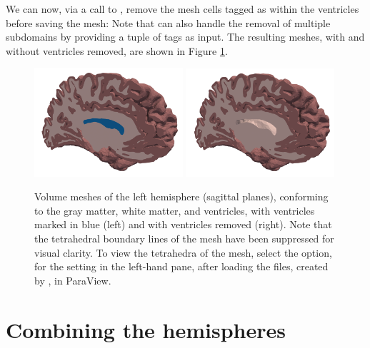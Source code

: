 We can now, via a call to \svmtk{} ,
remove the mesh cells tagged as within the ventricles before saving
the mesh:
Note that  can also handle the removal of
multiple subdomains by providing a tuple of tags as input. The resulting
meshes, with and without ventricles removed, are shown in Figure
\ref{fig:chp4:tags-with-without-ventricles}.
\begin{center}
\begin{figure}
  \includegraphics[width=0.49\textwidth]{./graphics/chp4/ernie-final-comp-b}
  \includegraphics[width=0.49\textwidth]{./graphics/chp4/ernie-final-comp-d}
    \caption{Volume meshes of the left hemisphere (sagittal planes),
      conforming to the gray matter, white matter, and ventricles, with
      ventricles marked in blue (left) and with ventricles removed (right). 
	Note that the tetrahedral boundary lines of the mesh have been 
	suppressed for visual clarity. To view the tetrahedra of the mesh, 
	select the  option, for the  
	setting in the left-hand pane, after loading the  files, 
	created by , in ParaView. 
	}
    \label{fig:chp4:tags-with-without-ventricles}
\end{figure}
\end{center}

\section{Combining the hemispheres}
\label{sec:chp4-left-right-tagged}

